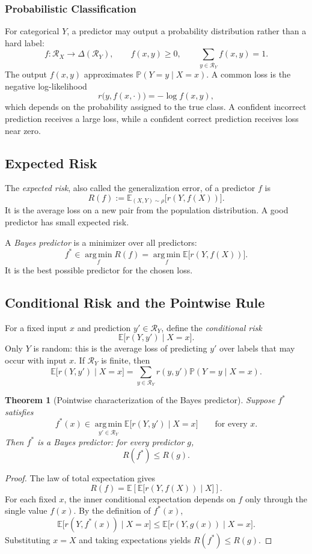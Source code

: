 \documentclass[12pt,oneside]{book}
\numberwithin{equation}{section}
\theoremstyle{definition}
\theoremstyle{plain}
\newtheorem{theorem}{Theorem}[section]
\theoremstyle{remark}
\newcommand{\E}{\mathbb{E}}
\newcommand{\argmin}{\operatorname*{arg\,min}}
\begin{document}
\subsubsection{Probabilistic Classification}
For categorical $Y$, a predictor may output a probability distribution rather than a hard label:
\[
f\colon\mathcal{R}_X\to\Delta(\mathcal{R}_Y),
\qquad
f(x,y)\geq0,
\qquad
\sum_{y\in\mathcal{R}_Y}f(x,y)=1.
\]
The output $f(x,y)$ approximates $\mathbb{P}(Y=y\mid X=x)$. A common loss is the negative log-likelihood
\[
r\bigl(y,f(x,\cdot)\bigr)=-\log f(x,y),
\]
which depends on the probability assigned to the true class. A confident incorrect prediction receives a large loss, while a confident correct prediction receives loss near zero.

\subsection{Expected Risk}
The \emph{expected risk}, also called the generalization error, of a predictor $f$ is
\[
R(f):=\E_{(X,Y)\sim\rho}\bigl[r(Y,f(X))\bigr].
\]
It is the average loss on a new pair from the population distribution. A good predictor has small expected risk.

A \emph{Bayes predictor} is a minimizer over all predictors:
\[
f^*\in\argmin_fR(f)
=\argmin_f\E\bigl[r(Y,f(X))\bigr].
\]
It is the best possible predictor for the chosen loss.

\subsection{Conditional Risk and the Pointwise Rule}
For a fixed input $x$ and prediction $y'\in\mathcal{R}_Y$, define the \emph{conditional risk}
\[
\E\bigl[r(Y,y')\mid X=x\bigr].
\]
Only $Y$ is random: this is the average loss of predicting $y'$ over labels that may occur with input $x$. If $\mathcal{R}_Y$ is finite, then
\[
\E\bigl[r(Y,y')\mid X=x\bigr]
=\sum_{y\in\mathcal{R}_Y}
r(y,y')\mathbb{P}(Y=y\mid X=x).
\]

\begin{theorem}[Pointwise characterization of the Bayes predictor]
Suppose $f^*$ satisfies
\[
f^*(x)\in\argmin_{y'\in\mathcal{R}_Y}
\E\bigl[r(Y,y')\mid X=x\bigr]
\qquad\text{for every }x.
\]
Then $f^*$ is a Bayes predictor: for every predictor $g$,
\[
R(f^*)\leq R(g).
\]
\end{theorem}

\begin{proof}
The law of total expectation gives
\[
R(f)=\E\left[\E\bigl[r(Y,f(X))\mid X\bigr]\right].
\]
For each fixed $x$, the inner conditional expectation depends on $f$ only through the single value $f(x)$. By the definition of $f^*(x)$,
\[
\E\bigl[r(Y,f^*(x))\mid X=x\bigr]
\leq
\E\bigl[r(Y,g(x))\mid X=x\bigr].
\]
Substituting $x=X$ and taking expectations yields $R(f^*)\leq R(g)$.
\end{proof}
\end{document}
